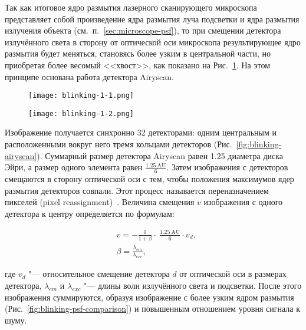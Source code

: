 Так как итоговое ядро размытия лазерного сканирующего микроскопа представляет собой произведение ядра размытия луча подсветки и ядра размытия излучения объекта (см.~п.~\ref{sec:microscope-psf}), то при смещении детектора излучённого света в сторону от оптической оси микроскопа результирующее ядро размытия будет меняться, становясь более узким в центральной части, но приобретая более весомый <<хвост>>, как показано на Рис.~\ref{fig:blinking-psf-displacement}. На этом принципе основана работа детектора Airyscan.

\begin{figure}[ht]
	\hfill
	\centering
	\begin{minipage}{0.45\textwidth}
		\centering
		\texttt{[image: blinking-1-1.png]}
		\label{fig:blinking-psf}
	\end{minipage} \hfill
	\begin{minipage}{0.45\textwidth}
		\centering
		\texttt{[image: blinking-1-2.png]}
		\label{fig:blinking-psf-displacement}
	\end{minipage}
	\hfill
\end{figure}

Изображение получается синхронно 32 детекторами: одним центральным и расположенными вокруг него тремя кольцами детекторов (Рис.~\ref{fig:blinking-airyscan}). Суммарный размер детектора Airyscan равен 1.25 диаметра диска Эйри, а размер одного элемента равен $\frac{1.25\ \mathrm{AU}}{6}$. Затем изображения с детекторов смещаются в сторону оптической оси с тем, чтобы положения максимумов ядер размытия детекторов совпали. Этот процесс называется переназначением пикселей (pixel reassignment)~\cite{sheppard2013superresolution}. Величина смещения $v$ изображения с одного детектора к центру определяется по формулам:

\begin{subequations}
	\begin{align}
		&v=-\frac{1}{1+\beta}\cdot\ \frac{1.25\ \mathrm{AU}}{6}\cdot v_d,  \nonumber \\
		&\beta=\frac{\lambda_{em}}{\lambda_{exc}},  \nonumber
	\end{align}
\end{subequations}

\noindent где $v_d$ "--- относительное смещение детектора $d$ от оптической оси в размерах детектора, $\lambda_{em}$ и $\lambda_{exc}$ "--- длины волн излучённого света и подсветки. После этого изображения суммируются, образуя изображение с более узким ядром размытия (Рис.~\ref{fig:blinking-psf-comparison}) и повышенным отношением уровня сигнала к шуму.

